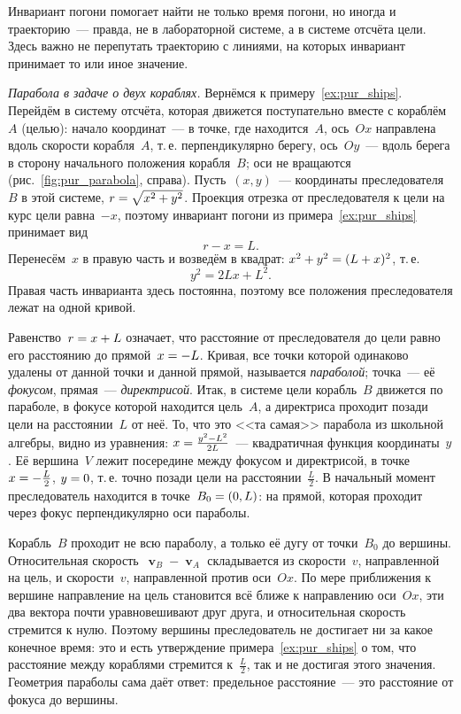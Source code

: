 \documentclass[../main.tex]{subfiles}
\begin{document}
Инвариант погони помогает найти не только время погони, но иногда и траекторию~---
правда, не в лабораторной системе, а в системе отсчёта цели. Здесь важно не
перепутать траекторию с линиями, на которых инвариант принимает то или иное
значение.

\noindent\textit{Парабола в задаче о двух кораблях.} Вернёмся к
примеру~\ref{ex:pur_ships}. Перейдём в систему отсчёта, которая движется
поступательно вместе с кораблём~$A$ (целью): начало координат~--- в точке, где
находится~$A$, ось~$Ox$ направлена вдоль скорости корабля~$A$, т.\,е. перпендикулярно
берегу, ось~$Oy$~--- вдоль берега в сторону начального положения корабля~$B$; оси не
вращаются (рис.~\ref{fig:pur_parabola}, справа). Пусть~$(x, y)$~--- координаты
преследователя~$B$ в этой системе, $r \hm= \sqrt{x^2 + y^2}$. Проекция отрезка от
преследователя к цели на курс цели равна~$-x$, поэтому инвариант погони из
примера~\ref{ex:pur_ships} принимает вид
\[
r - x = L.
\]
Перенесём~$x$ в правую часть и возведём в квадрат: $x^2 + y^2 \hm= (L + x)^2$, т.\,е.
\[
y^2 = 2Lx + L^2.
\]
Правая часть инварианта здесь постоянна, поэтому все положения преследователя лежат
на одной кривой.


Равенство~$r \hm= x + L$ означает, что расстояние от преследователя до цели равно
его расстоянию до прямой~$x \hm= -L$. Кривая, все точки которой одинаково удалены от
данной точки и данной прямой, называется \textit{параболой}; точка~--- её
\textit{фокусом}, прямая~--- \textit{директрисой}. Итак, в системе цели корабль~$B$
движется по параболе, в фокусе которой находится цель~$A$, а директриса проходит
позади цели на расстоянии~$L$ от неё. То, что это <<та самая>> парабола из школьной
алгебры, видно из уравнения: $x \hm= \frac{y^2 - L^2}{2L}$~--- квадратичная функция
координаты~$y$. Её вершина~$V$ лежит посередине между фокусом и директрисой, в точке~$x \hm= -\frac{L}{2}$, $y \hm= 0$, т.\,е. точно позади цели на расстоянии~$\frac{L}{2}$. В начальный момент преследователь находится в точке~$B_0 \hm= (0, L)$:
на прямой, которая проходит через фокус перпендикулярно оси параболы.

Корабль~$B$ проходит не всю параболу, а только её дугу от точки~$B_0$ до вершины.
Относительная скорость~$\mbfv_B - \mbfv_A$ складывается из скорости~$v$, направленной
на цель, и скорости~$v$, направленной против оси~$Ox$. По мере приближения к вершине
направление на цель становится всё ближе к направлению оси~$Ox$, эти два вектора
почти уравновешивают друг друга, и относительная скорость стремится к нулю. Поэтому
вершины преследователь не достигает ни за какое конечное время: это и есть
утверждение примера~\ref{ex:pur_ships} о том, что расстояние между кораблями
стремится к~$\frac{L}{2}$, так и не достигая этого значения. Геометрия параболы сама
даёт ответ: предельное расстояние~--- это расстояние от фокуса до вершины.
\end{document}
